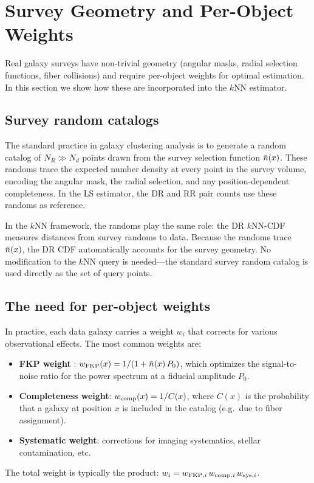 \section{Survey Geometry and Per-Object Weights}
\label{sec:weights}

Real galaxy surveys have non-trivial geometry (angular masks, radial selection functions, fiber collisions) and require per-object weights for optimal estimation.  In this section we show how these are incorporated into the $k$NN estimator.

\subsection{Survey random catalogs}
\label{sec:survey_randoms}

The standard practice in galaxy clustering analysis is to generate a random catalog of $N_R \gg N_d$ points drawn from the survey selection function $\bar{n}(x)$.  These randoms trace the expected number density at every point in the survey volume, encoding the angular mask, the radial selection, and any position-dependent completeness.  In the LS estimator, the DR and RR pair counts use these randoms as reference.

In the $k$NN framework, the randoms play the same role: the DR $k$NN-CDF measures distances from survey randoms to data.  Because the randoms trace $\bar{n}(x)$, the DR CDF automatically accounts for the survey geometry.  No modification to the $k$NN query is needed---the standard survey random catalog is used directly as the set of query points.

\subsection{The need for per-object weights}
\label{sec:weight_need}

In practice, each data galaxy carries a weight $w_i$ that corrects for various observational effects.  The most common weights are:
\begin{itemize}[nosep]
  \item \textbf{FKP weight} \citep{Feldman1994}: $w_{\rm FKP}(x) = 1/(1 + \bar{n}(x)\,P_0)$, which optimizes the signal-to-noise ratio for the power spectrum at a fiducial amplitude $P_0$.
  \item \textbf{Completeness weight}: $w_{\rm comp}(x) = 1/C(x)$, where $C(x)$ is the probability that a galaxy at position $x$ is included in the catalog (e.g.\ due to fiber assignment).
  \item \textbf{Systematic weight}: corrections for imaging systematics, stellar contamination, etc.
\end{itemize}
The total weight is typically the product: $w_i = w_{{\rm FKP},i}\,w_{{\rm comp},i}\,w_{{\rm sys},i}$.

